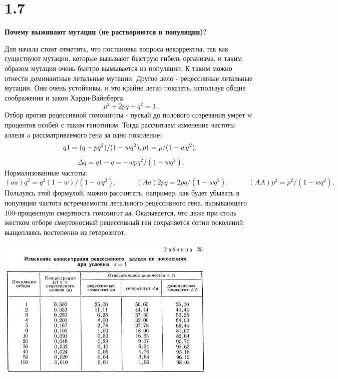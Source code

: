 \documentclass[a4paper,14pt]{article}
\begin{document}
\section*{1.7}
\begin{center}
	\LARGE{\textbf{Почему выживают мутации (не растворяются в популяции)?}}\\
\end{center}
Для начала стоит отметить, что постановка вопроса некорректна, так как существуют мутации, которые вызывают быструю гибель организма, и таким образом мутация очень быстро вымывается из популяции. К таким можно отнести доминантные летальные мутации.
Другое дело - рецессивные летальные мутации. Они очень устойчивы, и это крайне легко показать, используя общие соображения и закон Харди-Вайнберга:
\begin{equation*}
p^2 + 2pq + q^2 = 1.
\end{equation*}
Отбор против рецессивной гомозиготы - пускай до полового созревания умрет w процентов особей с таким генотипом. Тогда рассчитаем изменение частоты аллеля a рассматриваемого гена за одно поколение: 
\begin{equation*}
q1 = (q - pq^2) / (1 - wq^2), p1 =  p / (1 - wq^2),\\
\end{equation*}
\begin{equation*}
\Delta q = q1 - q =  - wpq^2  / (1 -wq^2).
\end{equation*}
Нормализованные частоты:
\begin{equation*}
(aa)  q^2=q^2(1-w)/(1-wq^2),\;\;\;\;\;\;\;\;\;\;(Aa) 2pq=2pq/ (1-wq^2),\;\;\;\;\;\;\;\;\;\;(AA) p^2=p^2/(1-wq^2).
\end{equation*}
Пользуясь этой формулой, можно рассчи­тать, например, как будет убывать в популяции частота встреча­емости летального рецессивного гена, вызывающего 100-процентную смертность гомозигот аа. Оказывается, что даже при столь жестком отборе смертоносный рецессивный ген сохраняется сотни поколений, выщепляясь постепенно из гетерозигот.
\begin{center}
	\includegraphics[width=0.80\textwidth]{img/1_7_0.png}
\end{center}
\end{document}

